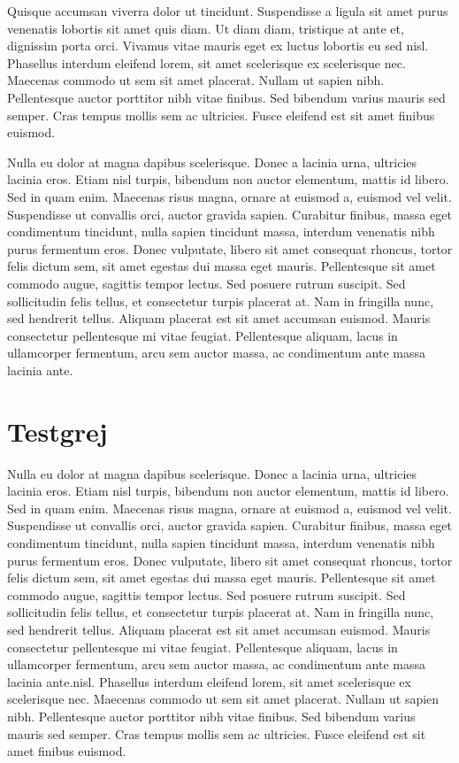 \documentclass[a4paper,10pt]{article}
\begin{document}
Quisque accumsan viverra dolor ut tincidunt. Suspendisse a ligula sit amet purus venenatis lobortis sit amet quis diam. Ut diam diam, tristique at ante et, dignissim porta orci. Vivamus vitae mauris eget ex luctus lobortis eu sed nisl. Phasellus interdum eleifend lorem, sit amet scelerisque ex scelerisque nec. Maecenas commodo ut sem sit amet placerat. Nullam ut sapien nibh. Pellentesque auctor porttitor nibh vitae finibus. Sed bibendum varius mauris sed semper. Cras tempus mollis sem ac ultricies. Fusce eleifend est sit amet finibus euismod.

Nulla eu dolor at magna dapibus scelerisque. Donec a lacinia urna, ultricies lacinia eros. Etiam nisl turpis, bibendum non auctor elementum, mattis id libero. Sed in quam enim. Maecenas risus magna, ornare at euismod a, euismod vel velit. Suspendisse ut convallis orci, auctor gravida sapien. Curabitur finibus, massa eget condimentum tincidunt, nulla sapien tincidunt massa, interdum venenatis nibh purus fermentum eros. Donec vulputate, libero sit amet consequat rhoncus, tortor felis dictum sem, sit amet egestas dui massa eget mauris. Pellentesque sit amet commodo augue, sagittis tempor lectus. Sed posuere rutrum suscipit. Sed sollicitudin felis tellus, et consectetur turpis placerat at. Nam in fringilla nunc, sed hendrerit tellus. Aliquam placerat est sit amet accumsan euismod. Mauris consectetur pellentesque mi vitae feugiat. Pellentesque aliquam, lacus in ullamcorper fermentum, arcu sem auctor massa, ac condimentum ante massa lacinia ante.

\section{Testgrej}
Nulla eu dolor at magna dapibus scelerisque. Donec a lacinia urna, ultricies lacinia eros. Etiam nisl turpis, bibendum non auctor elementum, mattis id libero. Sed in quam enim. Maecenas risus magna, ornare at euismod a, euismod vel velit. Suspendisse ut convallis orci, auctor gravida sapien. Curabitur finibus, massa eget condimentum tincidunt, nulla sapien tincidunt massa, interdum venenatis nibh purus fermentum eros. Donec vulputate, libero sit amet consequat rhoncus, tortor felis dictum sem, sit amet egestas dui massa eget mauris. Pellentesque sit amet commodo augue, sagittis tempor lectus. Sed posuere rutrum suscipit. Sed sollicitudin felis tellus, et consectetur turpis placerat at. Nam in fringilla nunc, sed hendrerit tellus. Aliquam placerat est sit amet accumsan euismod. Mauris consectetur pellentesque mi vitae feugiat. Pellentesque aliquam, lacus in ullamcorper fermentum, arcu sem auctor massa, ac condimentum ante massa lacinia ante.nisl. Phasellus interdum eleifend lorem, sit amet scelerisque ex scelerisque nec. Maecenas commodo ut sem sit amet placerat. Nullam ut sapien nibh. Pellentesque auctor porttitor nibh vitae finibus. Sed bibendum varius mauris sed semper. Cras tempus mollis sem ac ultricies. Fusce eleifend est sit amet finibus euismod.
\end{document}
